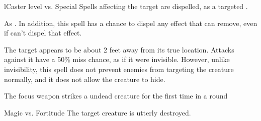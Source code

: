\begin{spellheader}
\end{spellheader}
\begin{spelleffects}
    \begin{spellattack}l{Caster level vs. Special}
        \spelleffect Spells affecting the target are dispelled, as a targeted .
    \end{spellattack}
\end{spelleffects}
\begin{spellfooter}
    \spellnotes As . In addition, this spell has a chance to dispel any effect that  can remove, even if  can't dispel that effect.
\end{spellfooter}

\begin{spellheader}
    \spellrng{\rngclose}
    \spelldur{\durshort \dismissable}
\end{spellheader}
\begin{spelleffects}
    \spelleffect The target appears to be about 2 feet away from its true location. Attacks against it have a 50\% miss chance, as if it were invisible. However, unlike invisibility, this spell does not prevent enemies from targeting the creature normally, and it does not allow the creature to hide.
\end{spelleffects}
\begin{spellfooter}

\end{spellfooter}

\begin{spellheader}
    \spellrng{\rngclose}
    \spelldur{\durshort}
\end{spellheader}
\begin{spelltrigger}{The focus weapon strikes a \bloodied undead creature for the first time in a round}
    \begin{spellattack}{Magic vs. Fortitude}
        \spellsuccess The target creature is utterly destroyed.
    \end{spellattack}
\end{spelltrigger}

